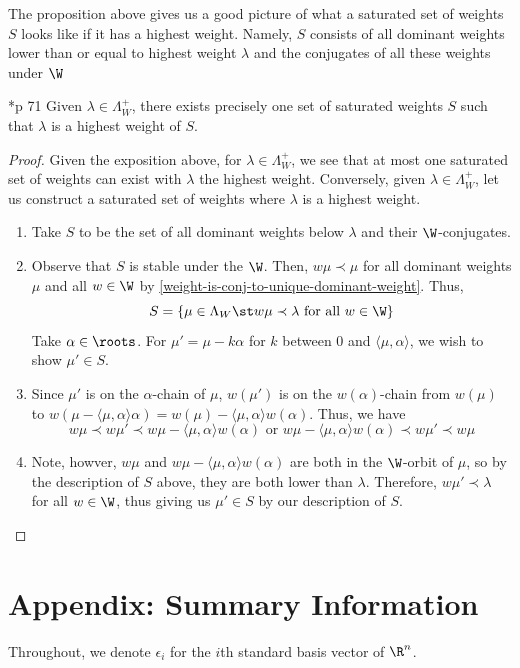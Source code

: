 \documentclass[11pt,leqno,oneside]{amsart}
\numberwithin{thm}{section}
\newcommand{\weightlattice}{\Lambda_W}
\begin{document}
The proposition above gives us a good picture of what a saturated set
of weights \(S\) looks like if it has a highest weight. Namely, \(S\)
consists of all dominant weights lower than or equal to highest weight
\(\lambda\) and the conjugates of all these weights under \(\W\)
\begin{cor}
  \cite{humph}*{p 71} Given \(\lambda \in \weightlattice^+\), there exists precisely one
  set of saturated weights \(S\) such that \(\lambda\) is a highest
  weight of \(S\).
\end{cor}
\begin{proof}
  Given the exposition above, for \(\lambda \in \weightlattice^+\), we
  see that at most one saturated set of weights can exist with
  \(\lambda\) the highest weight. Conversely, given \(\lambda \in
  \weightlattice^+\), let us construct a saturated set of weights where
  \(\lambda\) is a highest weight.
  \begin{enumerate}
  \item Take \(S\) to be the set of all dominant weights below
    \(\lambda\) and their \(\W\)-conjugates.
  \item Observe that \(S\) is stable under the \(\W\). Then, \(w \mu
    \prec \mu\) for all dominant weights \(\mu\) and all \(w \in
    \W\) by \ref{weight-is-conj-to-unique-dominant-weight}. Thus, \[
      S = \{\mu \in \weightlattice \st w \mu \prec \lambda \text{ for
        all } w \in \W\}
    \]
    Take \(\alpha \in \roots\). For \(\mu' = \mu - k \alpha\) for
    \(k\) between \(0\) and 
    \(\langle \mu, \alpha \rangle\), we wish to show \(\mu' \in S\).
  \item Since \(\mu'\) is on the \(\alpha\)-chain of \(\mu\),
    \(w(\mu')\) is on the \(w(\alpha)\)-chain from \(w(\mu)\) to
    \(w(\mu-\langle \mu,\alpha \rangle \alpha) = w(\mu)-\langle
    \mu,\alpha \rangle w(\alpha)\). Thus, we have \[
      w \mu \prec w \mu' \prec w \mu - \langle \mu,\alpha \rangle w
      (\alpha) \text{ or } w \mu - \langle \mu,\alpha \rangle w
      (\alpha) \prec w \mu' \prec w\mu
    \]
  \item Note, howver, \(w\mu\) and \(w \mu - \langle \mu,\alpha \rangle w
      (\alpha)\) are both in the \(\W\)-orbit of \(\mu\), so by the
      description of \(S\) above, they are both lower than
      \(\lambda\). Therefore, \(w \mu' \prec \lambda\) for all \(w \in
      \W\), thus giving us \(\mu' \in S\) by our description of \(S\).
  \end{enumerate}
\end{proof}
\section{Appendix: Summary Information}
Throughout, we denote \(\epsilon_i\) for the \(i\)th standard basis
vector of \(\R^n\).
\end{document}

